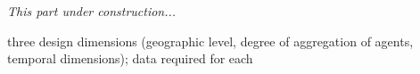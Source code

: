 \emph{This part under construction...}

three design dimensions (geographic level, degree of aggregation of agents, temporal dimensions); data required for each